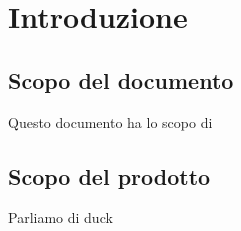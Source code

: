 \section{Introduzione}
\subsection{Scopo del documento}
Questo documento ha lo scopo di

\subsection{Scopo del prodotto}
Parliamo di \gls{duck}
